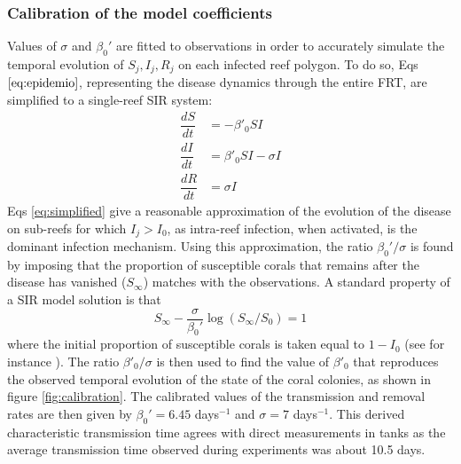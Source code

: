 \documentclass[utf8]{frontiersSCNS}
\begin{document}
\subsubsection{Calibration of the model coefficients}
Values of $\sigma$ and $\beta_0'$ are fitted to observations in order to accurately simulate the temporal evolution of $S_j,I_j,R_j$ on each infected reef polygon. To do so, Eqs $\ref{eq:epidemio}$, representing the disease dynamics through the entire FRT, are simplified to a single-reef SIR system:
\begin{equation}
    \begin{aligned}
        \dfrac{dS}{dt} &= -\beta'_0SI \\
        \dfrac{dI}{dt} &= \beta'_0SI - \sigma I \\
        \dfrac{dR}{dt} &= \sigma I
    \end{aligned}\label{eq:simplified}
\end{equation}
Eqs \ref{eq:simplified} give a reasonable approximation of the evolution of the disease on sub-reefs for which $I_j > I_0$, as intra-reef infection, when activated, is the dominant infection mechanism. Using this approximation, the ratio $\beta_0'/\sigma$ is found by imposing that the proportion of susceptible corals that remains after the disease has vanished ($S_\infty$) matches with the observations. A standard property of a SIR model solution is that
\begin{equation}
    S_\infty - \frac{\sigma}{\beta_0'}\log(S_{\infty}/S_0) = 1\label{eq:ratio}
\end{equation}
where the initial proportion of susceptible corals is taken equal to $1-I_0$ (see for instance \cite{Murray07}). The ratio $\beta'_0/\sigma$ is then used to find the value of $\beta'_0$ that reproduces the observed temporal evolution of the state of the coral colonies, as shown in figure \ref{fig:calibration}. The calibrated values of the transmission and removal rates are then given by $\beta_0'=6.45$ days$^{-1}$ and $\sigma=7$ days$^{-1}$. This derived characteristic transmission time agrees with direct measurements in tanks as the average transmission time observed during experiments was about 10.5 days.
\end{document}
